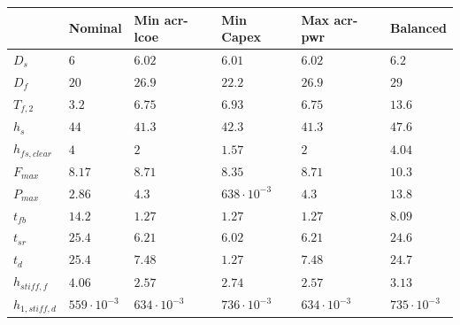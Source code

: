 \begin{tabular}{llllll}
& Nominal & Min \gls{acr-lcoe} & Min Capex & Max \gls{acr-pwr} & Balanced\\ 
\hline 
$D_s$ & $6 $ & $6.02 $ & $6.01 $ & $6.02 $ & $6.2 $ \\ 
$D_f$ & $20 $ & $26.9 $ & $22.2 $ & $26.9 $ & $29 $ \\ 
$T_{f,2}$ & $3.2 $ & $6.75 $ & $6.93 $ & $6.75 $ & $13.6 $ \\ 
$h_s$ & $44 $ & $41.3 $ & $42.3 $ & $41.3 $ & $47.6 $ \\ 
$h_{fs,clear}$ & $4 $ & $2 $ & $1.57 $ & $2 $ & $4.04 $ \\ 
$F_{max}$ & $8.17 $ & $8.71 $ & $8.35 $ & $8.71 $ & $10.3 $ \\ 
$P_{max}$ & $2.86 $ & $4.3 $ & $638 \cdot 10^{-3}$ & $4.3 $ & $13.8 $ \\ 
$t_{fb}$ & $14.2 $ & $1.27 $ & $1.27 $ & $1.27 $ & $8.09 $ \\ 
$t_{sr}$ & $25.4 $ & $6.21 $ & $6.02 $ & $6.21 $ & $24.6 $ \\ 
$t_d$ & $25.4 $ & $7.48 $ & $1.27 $ & $7.48 $ & $24.7 $ \\ 
$h_{stiff,f}$ & $4.06 $ & $2.57 $ & $2.74 $ & $2.57 $ & $3.13 $ \\ 
$h_{1,stiff,d}$ & $559 \cdot 10^{-3}$ & $634 \cdot 10^{-3}$ & $736 \cdot 10^{-3}$ & $634 \cdot 10^{-3}$ & $735 \cdot 10^{-3}$ \\ 
\end{tabular}
